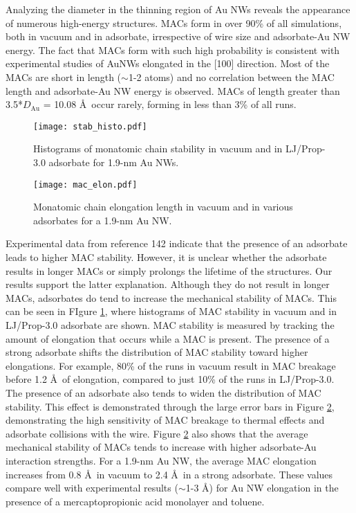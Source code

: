 \documentclass[10pt]{report}  %
\newcommand\findent{\hspace*{\parindent}}
\begin{document}
\findent Analyzing the diameter in the thinning region of Au NWs reveals the appearance of numerous high-energy structures.  MACs form in over 90\% of all simulations, both in vacuum and in adsorbate, irrespective of wire size and adsorbate-Au NW energy.  The fact that MACs form with such high probability is consistent with experimental studies of AuNWs elongated in the [100] direction. \cite{Rodrigues:2000}  Most of the MACs are short in length ($\sim$1-2 atoms) and no correlation between the MAC length and adsorbate-Au NW energy is observed.  MACs of length greater than 3.5*$D_\mathrm{Au}$ = 10.08 \AA\ occur rarely, forming in less than 3\% of all runs.  

% 
%
\begin{figure}[]
	\centering
	\texttt{[image: stab\_histo.pdf]}
	\caption{Histograms of monatomic chain stability in vacuum and in LJ/Prop-3.0 adsorbate for 1.9-nm Au NWs. }
	\label{fig:stab_histo}
\end{figure}  


%
%
\begin{figure}[]
	\centering
	\texttt{[image: mac\_elon.pdf]}
	\caption{Monatomic chain elongation length in vacuum and in various adsorbates for a 1.9-nm Au NW. }
	\label{fig:mac_elon}
\end{figure}

Experimental data from reference 142 indicate that the presence of an adsorbate leads to higher MAC stability.  However, it is unclear whether the adsorbate results in longer MACs or simply prolongs the lifetime of the structures.  Our results support the latter explanation.  Although they do not result in longer MACs, adsorbates do tend to increase the mechanical stability of MACs.  This can be seen in FIgure \ref{fig:stab_histo}, where histograms of MAC stability in vacuum and in LJ/Prop-3.0 adsorbate are shown.  MAC stability is measured by tracking the amount of elongation that occurs while a MAC is present.  The presence of a strong adsorbate shifts the distribution of MAC stability toward higher elongations.  For example, 80\% of the runs in vacuum result in MAC breakage before 1.2 \AA\ of elongation, compared to just 10\% of the runs in LJ/Prop-3.0.  The presence of an adsorbate also tends to widen the distribution of MAC stability.  This effect is demonstrated through the large error bars in Figure \ref{fig:mac_elon}, demonstrating the high sensitivity of MAC breakage to thermal effects and adsorbate collisions with the wire.  Figure \ref{fig:mac_elon} also shows that the average mechanical stability of MACs tends to increase with higher adsorbate-Au interaction strengths. For a 1.9-nm Au NW, the average MAC elongation increases from 0.8 \AA\ in vacuum to 2.4 \AA\ in a strong adsorbate.  These values compare well with experimental results ($\sim$1-3 \AA) for Au NW elongation in the presence of a mercaptopropionic acid monolayer \cite{He:2002} and toluene.\cite{Tsutsui_nl:2009}
\end{document}

